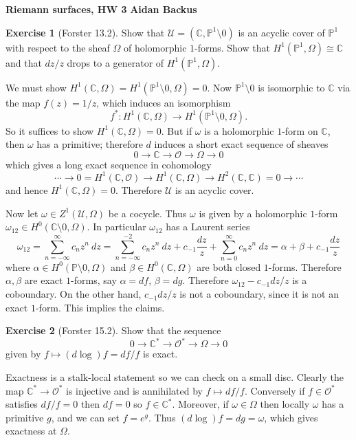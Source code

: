 \documentclass[10pt]{article}
\newcommand{\CC}{\mathbb{C}}
\newcommand{\PP}{\mathbb P}
\newcommand{\Olo}{\mathscr O}
\theoremstyle{definition}
\newtheorem{exer}{Exercise}
\begin{document}
\noindent
\large\textbf{Riemann surfaces, HW 3} \hfill \textbf{Aidan Backus} \\

\begin{exer}[Forster 13.2]
Show that $\mathcal U = (\CC, \PP^1 \setminus 0)$ is an acyclic cover of $\PP^1$ with respect to the sheaf $\Omega$ of holomorphic $1$-forms.
Show that $H^1(\PP^1, \Omega) \cong \CC$ and that $dz/z$ drops to a generator of $H^1(\PP^1, \Omega)$.
\end{exer}

We must show $H^1(\CC, \Omega) = H^1(\PP^1 \setminus 0, \Omega) = 0$.
Now $\PP^1 \setminus 0$ is isomorphic to $\CC$ via the map $f(z) = 1/z$, which induces an isomorphism
$$f^*: H^1(\CC, \Omega) \to H^1(\PP^1 \setminus 0, \Omega).$$
So it suffices to show $H^1(\CC, \Omega) = 0$.
But if $\omega$ is a holomorphic $1$-form on $\CC$, then $\omega$ has a primitive; therefore $d$ induces a short exact sequence of sheaves
$$0 \to \CC \to \Olo \to \Omega \to 0$$
which gives a long exact sequence in cohomology
$$\cdots \to 0 = H^1(\CC, \Olo) \to H^1(\CC, \Omega) \to H^2(\CC, \CC) = 0 \to \cdots$$
and hence $H^1(\CC, \Omega) = 0$.
Therefore $\mathcal U$ is an acyclic cover.

Now let $\omega \in Z^1(\mathcal U, \Omega)$ be a cocycle.
Thus $\omega$ is given by a holomorphic $1$-form $\omega_{12} \in H^0(\CC \setminus 0, \Omega)$.
In particular $\omega_{12}$ has a Laurent series
$$\omega_{12} = \sum_{n=-\infty}^\infty c_n z^n ~dz = \sum_{n=-\infty}^{-2} c_n z^n~dz + c_{-1} \frac{dz}{z} + \sum_{n=0}^\infty c_n z^n~dz = \alpha + \beta + c_{-1} \frac{dz}{z}$$
where $\alpha \in H^0(\PP \setminus 0, \Omega)$ and $\beta \in H^0(\CC, \Omega)$ are both closed $1$-forms.
Therefore $\alpha,\beta$ are exact $1$-forms, say $\alpha = df$, $\beta = dg$.
Therefore $\omega_{12} - c_{-1}dz/z$ is a coboundary.
On the other hand, $c_{-1}dz/z$ is not a coboundary, since it is not an exact $1$-form.
This implies the claims.

\begin{exer}[Forster 15.2]
Show that the sequence
$$0 \to \CC^* \to \Olo^* \to \Omega \to 0$$
given by $f \mapsto (d \log)f = df/f$ is exact.
\end{exer}

Exactness is a stalk-local statement so we can check on a small disc.
Clearly the map $\CC^* \to \Olo^*$ is injective and is annihilated by $f \mapsto df/f$.
Conversely if $f \in \Olo^*$ satisfies $df/f = 0$ then $df = 0$ so $f \in \CC^*$.
Moreover, if $\omega \in \Omega$ then locally $\omega$ has a primitive $g$, and we can set $f = e^g$.
Thus $(d \log)f = dg = \omega$, which gives exactness at $\Omega$.
\end{document}
